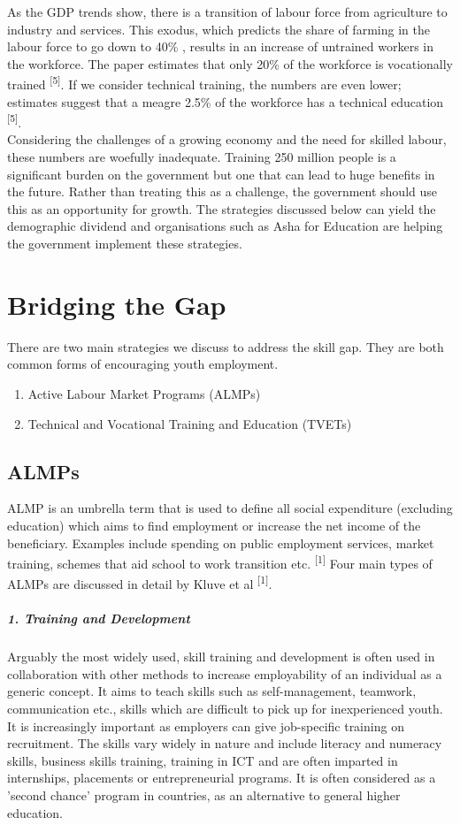 \documentclass[a4paper, 10pt]{article}
\begin{document}
\noindent As the GDP trends show, there is a transition of labour force from agriculture to industry and services. This exodus, which predicts the share of farming in the labour force to go down to 40\% , results in an increase of untrained workers in the workforce. The paper estimates that only 20\% of the workforce is vocationally trained \textsuperscript{[5]}. If we consider technical training, the numbers are even lower; estimates suggest that a meagre 2.5\% of the workforce has a technical education \textsuperscript{[5]}. \\

\noindent Considering the challenges of a growing economy and the need for skilled labour, these numbers are woefully inadequate. Training 250 million people is a significant burden on the government but one that can lead to huge benefits in the future. Rather than treating this as a challenge, the government should use this as an opportunity for growth. The strategies discussed below can yield the demographic dividend and organisations such as Asha for Education are helping the government implement these strategies. 

\section*{Bridging the Gap}
There are two main strategies we discuss to address the skill gap. They are both common forms of encouraging youth employment. 
\begin{enumerate}
\item Active Labour Market Programs (ALMPs)
\item Technical and Vocational Training and Education (TVETs)
\end{enumerate}

\subsection*{ALMPs}
ALMP is an umbrella term that is used to define all social expenditure (excluding education) which aims to find employment or increase the net income of the beneficiary. Examples include spending on public employment services, market training, schemes that aid school to work transition etc. \textsuperscript{[1]} Four main types of ALMPs are discussed in detail by Kluve et al \textsuperscript{[1]}.

\subparagraph*{1. Training and Development}
Arguably the most widely used, skill training and development is often used in collaboration with other methods to increase employability of an individual as a generic concept. It aims to teach skills such as self-management, teamwork, communication etc., skills which are difficult to pick up for inexperienced youth. It is increasingly important as employers can give job-specific training on recruitment. The skills vary widely in nature and include literacy and numeracy skills, business skills training, training in ICT and are often imparted in internships, placements or entrepreneurial programs. It is often considered as a 'second chance' program in countries, as an alternative to general higher education. \\
\end{document}
